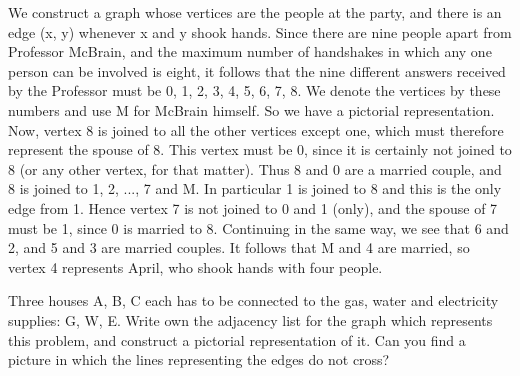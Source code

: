 \begin{questions}
\begin{solution}
\begin{center}
\begin{adjustbox}{max width=0.6\textwidth}
		\end{adjustbox}
		\end{center}

	
	We construct a graph whose vertices are the people at the party, and there is an edge (x, y) whenever x and y shook hands.
	Since there are nine people apart from Professor McBrain, and the maximum number of handshakes in which any one person can be involved is eight, it follows that the nine different answers received by the Professor must be 0, 1, 2, 3, 4, 5, 6, 7, 8.
	We denote the vertices by these numbers and use M for McBrain himself.
	So we have a pictorial representation.
	Now, vertex 8 is joined to all the other vertices except one, which must therefore represent the spouse of 8.
	This vertex must be 0, since it is certainly not joined to 8 (or any other vertex, for that matter).
	Thus 8 and 0 are a married couple, and 8 is joined to 1, 2, ..., 7 and M.
	In particular 1 is joined to 8 and this is the only edge from 1.
	Hence vertex 7 is not joined to 0 and 1 (only), and the spouse of 7 must be 1, since 0 is married to 8.
	Continuing in the same way, we see that 6 and 2, and 5 and 3 are married couples.
	It follows that M and 4 are married, so vertex 4 represents April, who shook hands with four people.
  \end{solution}

\question
Three houses A, B, C each has to be connected to the gas, water and electricity supplies: G, W, E.
Write own the adjacency list for the graph which represents this problem, and construct a pictorial representation of it.
Can you find a picture in which the lines representing the edges do not cross?~\cite{biggs02}


\end{questions}
